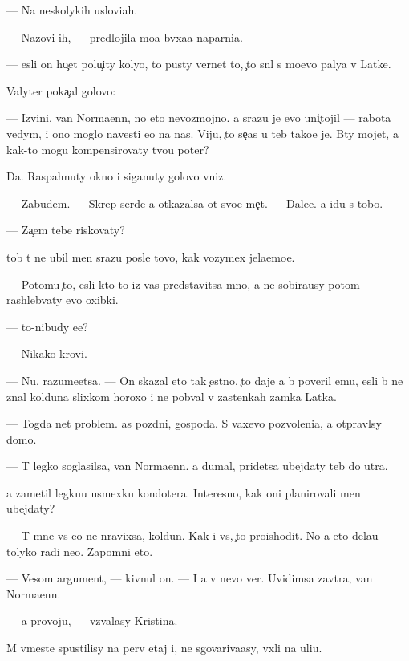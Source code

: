 \documentclass[10pt]{book}
\begin{document}
— Na neskolykih uslovi{\y}ah.

— Nazovi ih, — predlojila mo{\y}a b{\yi}vxa{\y}a naparni{\q}a.

— {\Y}esli on ho{\c}et polu{\c}ity koly{\q}o, to pusty vernet to, {\c}to sn{\ia}l s mo{\y}evo paly{\q}a v Latke.

Valyter poka{\c}al golovo{\y}:

— Izvini, van Norma{\y}enn, no eto nevozmojno. {\Y}a srazu je {\y}evo uni{\c}tojil — rabota vedym{\yi}, i ono moglo navesti {\y}e{\y}o na nas. Viju, {\c}to se{\y}{\c}as u teb{\ia} tako{\y}e je. B{\yi}ty mojet, {\y}a kak-to mogu kompensirovaty tvo{\y}u poter{\iu}?

Da. Raspahnuty okno i siganuty golovo{\y} vniz.

— Zabudem. — Skrep{\ia} serd{\q}e {\y}a otkazalsa ot svo{\y}e{\y} me{\c}t{\yi}. — Dale{\y}e. {\Y}a idu s tobo{\y}.

— Za{\c}em tebe riskovaty?

{\C}tob{\yi} t{\yi} ne ubil men{\ia} srazu posle tovo, kak vozymex jela{\y}emo{\y}e.

— Potomu {\c}to, {\y}esli kto-to iz vas predstavitsa mno{\y}, {\y}a ne sobira{\y}usy potom rashleb{\yi}vaty {\y}evo oxibki.

— {\C}to-nibudy {\y}e{\x}e?

— Nikako{\y} krovi.

— Nu, razume{\y}etsa. — On skazal eto tak {\c}estno, {\c}to daje {\y}a b{\yi} poveril {\y}emu, {\y}esli b{\yi} ne znal kolduna slixkom horoxo i ne pob{\yi}val v zastenkah zamka Latka.

— Togda net problem. {\C}as pozdni{\y}, gospoda. S vaxevo pozvoleni{\y}a, {\y}a otpravl{\iu}sy domo{\y}.

— T{\yi} legko soglasilsa, van Norma{\y}enn. {\Y}a dumal, pridetsa ubejdaty teb{\ia} do utra.

{\Y}a zametil legku{\y}u usmexku kondot{\y}era. Interesno, kak oni planirovali men{\ia} ubejdaty?

— T{\yi} mne vs{\e} {\y}e{\x}o ne nravixsa, koldun. Kak i vs{\e}, {\c}to proishodit. No {\y}a eto dela{\y}u tolyko radi ne{\y}o. Zapomni eto.

— Vesom{\yi}{\y} argument, — kivnul on. — I {\y}a v nevo ver{\iu}. Uvidimsa zavtra, van Norma{\y}enn.

— {\Y}a provoju, — v{\yi}zvalasy Kristina.

M{\yi} vmeste spustilisy na perv{\yi}{\y} etaj i, ne sgovariva{\y}asy, v{\yi}xli na uli{\q}u.
\end{document}
